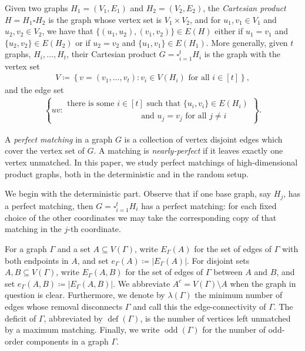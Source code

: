\documentclass[10pt,a4paper]{article}
\newcommand{\defi}{\operatorname{def}}
\newcommand{\odd}{\operatorname{odd}}
\begin{document}
Given two graphs $H_1=(V_1,E_1)$ and $H_2=(V_2,E_2)$, the \textit{Cartesian product} $H=H_1\square H_2$ is the graph whose vertex set is $V_1\times V_2$, and for $u_1,v_1\in V_1$ and $u_2,v_2\in V_2$, we have that $\{(u_1,u_2),(v_1,v_2)\}\in E(H)$ either if $u_1=v_1$ and $\{u_2,v_2\}\in E(H_2)$ or if $u_2=v_2$ and $\{u_1,v_1\}\in E(H_1)$. More generally, given $t$ graphs, $H_i,\ldots, H_t$, their Cartesian product $G=\square_{i=1}^tH_i$ is the graph with the vertex set
\begin{align*}
    V\coloneqq \left\{v=(v_1,\ldots, v_t)\colon v_i\in V(H_i)\text{ for all } i\in[t]\right\},
\end{align*}
and the edge set
\begin{align*}
  \left\{uv \colon \begin{array}{l} \text{there is some } i\in [t] \text{ such that }  \{u_i,v_i\}\in E\left(H_i\right)\\
   \qquad\qquad\qquad\quad\qquad \text{and } u_j=v_j \text{ for all } j \neq i \end{array}\right\}.
\end{align*}

A \emph{perfect matching} in a graph $G$ is a collection of vertex disjoint edges which cover the vertex set of $G$. A matching is \emph{nearly-perfect} if it leaves exactly one vertex unmatched. In this paper, we study perfect matchings of high-dimensional product graphs, both in the deterministic and in the random setup. 

We begin with the deterministic part. Observe that if one base graph, say $H_j$, has a perfect matching, then $G=\square_{i=1}^tH_i$ has a perfect matching: for each fixed choice of the other coordinates we may take the corresponding copy of that matching in the $j$-th coordinate.

For a graph $\Gamma$ and a set $A\subseteq V(\Gamma)$, write $E_\Gamma(A)$ for the set of edges of $\Gamma$ with both endpoints in $A$, and set $e_\Gamma(A)\coloneqq |E_\Gamma(A)|$.
For disjoint sets $A,B\subseteq V(\Gamma)$, write $E_\Gamma(A,B)$ for the set of edges of $\Gamma$ between $A$ and $B$, and set $e_\Gamma(A,B)\coloneqq |E_\Gamma(A,B)|$.
We abbreviate $A^c=V(\Gamma)\setminus A$ when the graph in question is clear. Furthermore, we denote by $\lambda(\Gamma)$ the minimum number of edges whose removal disconnects $\Gamma$ and call this the edge-connectivity of $\Gamma$. The deficit of $\Gamma$, abbreviated by $\defi(\Gamma)$, is the number of vertices left unmatched by a maximum matching.
Finally, we write $\odd(\Gamma)$ for the number of odd-order components in a graph $\Gamma$.
\end{document}
